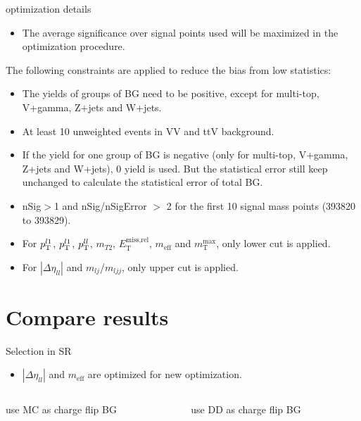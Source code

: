 \documentclass[mathserif,serif]{beamer}
\begin{document}
\begin{frame}{optimization details}
\small
\begin{itemize}
\item The average significance over signal points used will be maximized in the optimization procedure.
\end{itemize}
The following constraints are applied to reduce the bias from low statistics:
\begin{itemize}
\small
\item The yields of groups of BG need to be positive, except for multi-top, V+gamma, Z+jets and W+jets.
\item At least 10 unweighted events in VV and ttV background.
\item If the yield for one group of BG is negative (only for multi-top, V+gamma, Z+jets and W+jets), 0 yield is used. But the statistical error still keep unchanged to calculate the statistical error of total BG.
\item nSig$>$1 and nSig/nSigError $>$ 2 for the first 10 signal mass points (393820 to 393829).
\item For $p_{\text{T}}^{l1}$, $p_{\text{T}}^{l1}$, $p_{\text{T}}^{ll}$, $m_{T2}$, $E_{\text{T}}^{\text{miss,rel}}$, $m_{\text{eff}}$ and $m_{\text{T}}^{\text{max}}$, only lower cut is applied.
\item For $|\Delta\eta_{ll}|$ and $m_{lj}$/$m_{ljj}$, only upper cut is applied.
\end{itemize}
\end{frame}

\section{Compare results}
\begin{frame}{Selection in SR}
\tiny
\begin{itemize}
\item $|\Delta\eta_{ll}|$ and $m_{\text{eff}}$ are optimized for new optimization.
\end{itemize}

\begin{table}[htbp]
\centering
\tiny

\begin{columns}

\begin{column}{0.5\textwidth}
\scalebox{0.8}{

\end{tabular}
}
\caption{\tiny use MC as charge flip BG}
\end{column}

\begin{column}{0.5\textwidth}
\scalebox{0.8}{

\end{tabular}
}
\caption{\tiny use DD as charge flip BG}
\end{column}

\end{columns}
\end{table}
\end{frame}
\end{document}
